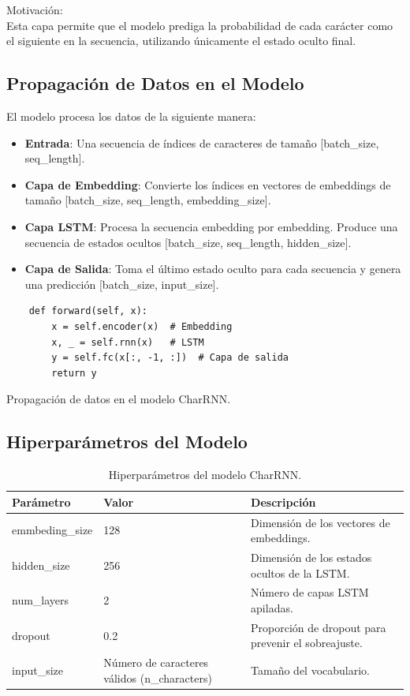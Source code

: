 \documentclass{article}
\begin{document}
{\large{Motivación}}: \\

Esta capa permite que el modelo prediga la probabilidad de cada carácter como el siguiente en la secuencia, utilizando únicamente el estado oculto final.

\newpage

\subsection{Propagación de Datos en el Modelo}
El modelo procesa los datos de la siguiente manera:
\begin{itemize}
    \item \textbf{Entrada}: Una secuencia de índices de caracteres de tamaño [batch\_size, seq\_length].
    \item \textbf{Capa de Embedding}: Convierte los índices en vectores de embeddings de tamaño [batch\_size, seq\_length, embedding\_size].
    \item \textbf{Capa LSTM}: Procesa la secuencia embedding por embedding. Produce una secuencia de estados ocultos [batch\_size, seq\_length, hidden\_size].
    \item \textbf{Capa de Salida}: Toma el último estado oculto para cada secuencia y genera una predicción [batch\_size, input\_size].
\end{itemize}

\begin{listing}[H]
\begin{verbatim}
    def forward(self, x):
        x = self.encoder(x)  # Embedding
        x, _ = self.rnn(x)   # LSTM
        y = self.fc(x[:, -1, :])  # Capa de salida
        return y
\end{verbatim}
\caption{Propagación de datos en el modelo CharRNN.}
\end{listing}

\newpage

\subsection{Hiperparámetros del Modelo}
\begin{table}[H]
    \centering
    \begin{tabularx}{\textwidth}{ |X|X|X| }
        \hline
        \textbf{Parámetro} & \textbf{Valor} & \textbf{Descripción} \\ \hline
        emmbeding\_size & 128 & Dimensión de los vectores de embeddings. \\ \hline
        hidden\_size & 256 & Dimensión de los estados ocultos de la LSTM. \\ \hline
        num\_layers & 2 & Número de capas LSTM apiladas. \\ \hline
        dropout & 0.2 & Proporción de dropout para prevenir el sobreajuste. \\ \hline
        input\_size & Número de caracteres válidos (n\_characters) & Tamaño del vocabulario. \\ \hline
    \end{tabularx}
    \caption{Hiperparámetros del modelo CharRNN.}
\end{table}
\end{document}
